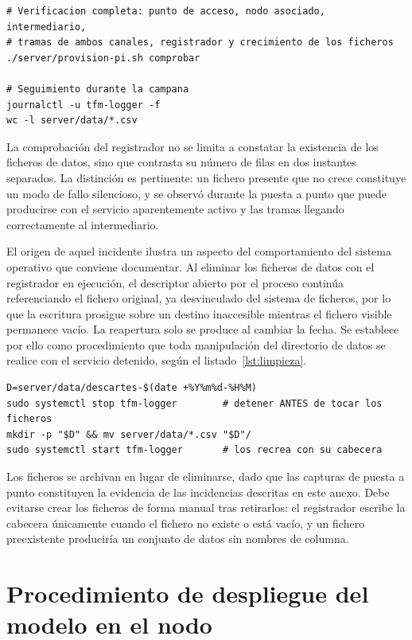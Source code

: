 \begin{lstlisting}[caption={Verificacion de la cadena de adquisicion en el concentrador.}, label={lst:verificacion}]
# Verificacion completa: punto de acceso, nodo asociado, intermediario,
# tramas de ambos canales, registrador y crecimiento de los ficheros
./server/provision-pi.sh comprobar

# Seguimiento durante la campana
journalctl -u tfm-logger -f
wc -l server/data/*.csv
\end{lstlisting}

La comprobación del registrador no se limita a constatar la existencia de los ficheros de
datos, sino que contrasta su número de filas en dos instantes separados. La distinción es
pertinente: un fichero presente que no crece constituye un modo de fallo silencioso, y se
observó durante la puesta a punto que puede producirse con el servicio aparentemente activo y
las tramas llegando correctamente al intermediario.

El origen de aquel incidente ilustra un aspecto del comportamiento del sistema operativo que
conviene documentar. Al eliminar los ficheros de datos con el registrador en ejecución, el
descriptor abierto por el proceso continúa referenciando el fichero original, ya desvinculado
del sistema de ficheros, por lo que la escritura prosigue sobre un destino inaccesible
mientras el fichero visible permanece vacío. La reapertura solo se produce al cambiar la
fecha. Se establece por ello como procedimiento que toda manipulación del directorio de datos
se realice con el servicio detenido, según el listado~\ref{lst:limpieza}.

\begin{lstlisting}[caption={Reinicio del directorio de datos antes de una campana.}, label={lst:limpieza}]
D=server/data/descartes-$(date +%Y%m%d-%H%M)
sudo systemctl stop tfm-logger        # detener ANTES de tocar los ficheros
mkdir -p "$D" && mv server/data/*.csv "$D"/
sudo systemctl start tfm-logger       # los recrea con su cabecera
\end{lstlisting}

Los ficheros se archivan en lugar de eliminarse, dado que las capturas de puesta a punto
constituyen la evidencia de las incidencias descritas en este anexo. Debe
evitarse crear los ficheros de forma manual tras retirarlos: el registrador escribe la
cabecera únicamente cuando el fichero no existe o está vacío, y un fichero preexistente
produciría un conjunto de datos sin nombres de columna.

\section{Procedimiento de despliegue del modelo en el nodo}

